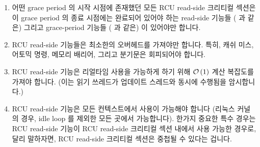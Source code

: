 \begin{enumerate}
\item	어떤 grace period 의 시작 시점에 존재했던 모든 RCU read-side 크리티컬
	섹션은 이 grace period 의 종료 시점에는 완료되어 있어야 하는 read-side
	기능들 ( 과  같은) 그리고
	grace-period 기능들 ( 과  같은) 이
	있어야만 합니다.
\item	RCU read-side 기능들은 최소한의 오버헤드를 가져야만 합니다.
	특히, 캐쉬 미스, 어토믹 명령, 메모리 배리어, 그리고 분기문은 회피되어야
	합니다.
\item	RCU read-side 기능은 리얼타임 사용을 가능하게 하기 위해 $\O{1}$ 계산
	복잡도를 가져야 합니다.
	(이는 읽기 쓰레드가 업데이트 스레드와 동시에 수행됨을 암시합니다.)
\item	RCU read-side 기능은 모든 컨텍스트에서 사용이 가능해야 합니다 (리눅스
	커널의 경우, idle loop 를 제외한 모든 곳에서 가능합니다).
	한가지 중요한 특수 경우는 RCU read-side 기능이 RCU read-side 크리티컬
	섹션 내에서 사용 가능한 경우로, 달리 말하자면, RCU read-side 크리티컬
	섹션은 중첩될 수 있다는 겁니다.

\iffalse

\item	There must be read-side primitives (such as \co{rcu_read_lock()}
	and \co{rcu_read_unlock()}) and grace-period primitives
	(such as \co{synchronize_rcu()} and \co{call_rcu()}), such
	that any RCU read-side critical section in existence at the
	start of a grace period has completed by the end of the
	grace period.
\item	RCU read-side primitives should have minimal overhead.
	In particular, expensive operations such as cache misses,
	atomic instructions, memory barriers, and branches should
	be avoided.
\item	RCU read-side primitives should have $\O{1}$ computational
	complexity to enable real-time use.
	(This implies that readers run concurrently with updaters.)
\item	RCU read-side primitives should be usable in all contexts
	(in the Linux kernel, they are permitted everywhere except in
	the idle loop).
	An important special case is that RCU read-side primitives be
	usable within an RCU read-side critical section, in other words,
	that it be possible to nest RCU read-side critical sections.

\fi


\end{enumerate}
